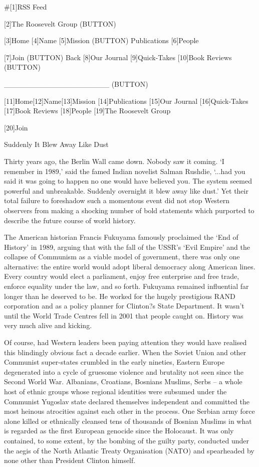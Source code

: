    #[1]RSS Feed

   [2]The Roosevelt Group
   (BUTTON)

   [3]Home [4]Name [5]Mission (BUTTON) Publications [6]People

   [7]Join
   (BUTTON) Back [8]Our Journal [9]Quick-Takes [10]Book Reviews
   (BUTTON)

   ____________________ (BUTTON)

   [11]Home[12]Name[13]Mission [14]Publications [15]Our Journal
   [16]Quick-Takes [17]Book Reviews [18]People
   [19]The Roosevelt Group

   [20]Join

Suddenly It Blew Away Like Dust


   Thirty years ago, the Berlin Wall came down. Nobody saw it coming. `I
   remember in 1989,' said the famed Indian novelist Salman Rushdie,
   `...had you said it was going to happen no one would have believed you.
   The system seemed powerful and unbreakable. Suddenly overnight it blew
   away like dust.' Yet their total failure to foreshadow such a momentous
   event did not stop Western observers from making a shocking number of
   bold statements which purported to describe the future course of world
   history.

   The American historian Francis Fukuyama famously proclaimed the `End of
   History' in 1989, arguing that with the fall of the USSR's `Evil
   Empire' and the collapse of Communism as a viable model of government,
   there was only one alternative: the entire world would adopt liberal
   democracy along American lines. Every country would elect a parliament,
   enjoy free enterprise and free trade, enforce equality under the law,
   and so forth. Fukuyama remained influential far longer than he deserved
   to be. He worked for the hugely prestigious RAND corporation and as a
   policy planner for Clinton?s State Department. It wasn't until the
   World Trade Centres fell in 2001 that people caught on. History was
   very much alive and kicking.

   Of course, had Western leaders been paying attention they would have
   realised this blindingly obvious fact a decade earlier. When the Soviet
   Union and other Communist super-states crumbled in the early nineties,
   Eastern Europe degenerated into a cycle of gruesome violence and
   brutality not seen since the Second World War. Albanians, Croatians,
   Bosnians Muslims, Serbs -- a whole host of ethnic groups whose regional
   identities were subsumed under the Communist Yugoslav state declared
   themselves independent and committed the most heinous atrocities
   against each other in the process. One Serbian army force alone killed
   or ethnically cleansed tens of thousands of Bosnian Muslims in what is
   regarded as the first European genocide since the Holocaust. It was
   only contained, to some extent, by the bombing of the guilty party,
   conducted under the aegis of the North Atlantic Treaty Organisation
   (NATO) and spearheaded by none other than President Clinton himself.

